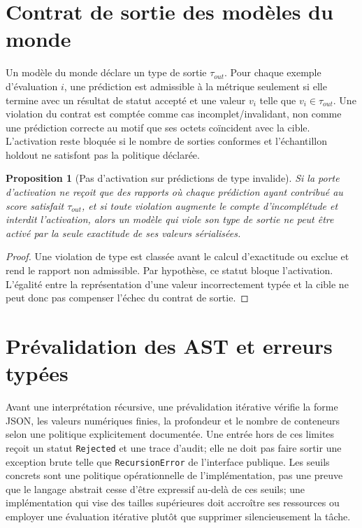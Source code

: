 \documentclass[11pt,a4paper,openany]{book}
\theoremstyle{definition}
\theoremstyle{plain}
\newtheorem{proposition}[definition]{Proposition}
\theoremstyle{remark}
\begin{document}
\section{Contrat de sortie des modèles du monde}
Un modèle du monde déclare un type de sortie $\tau_{out}$. Pour chaque exemple d'évaluation $i$, une prédiction est admissible à la métrique seulement si elle termine avec un résultat de statut accepté et une valeur $v_i$ telle que $v_i\in\tau_{out}$. Une violation du contrat est comptée comme cas incomplet/invalidant, non comme une prédiction correcte au motif que ses octets coïncident avec la cible. L'activation reste bloquée si le nombre de sorties conformes et l'échantillon holdout ne satisfont pas la politique déclarée.

\begin{proposition}[Pas d'activation sur prédictions de type invalide]
Si la porte d'activation ne reçoit que des rapports où chaque prédiction ayant contribué au score satisfait $\tau_{out}$, et si toute violation augmente le compte d'incomplétude et interdit l'activation, alors un modèle qui viole son type de sortie ne peut être activé par la seule exactitude de ses valeurs sérialisées.
\end{proposition}
\begin{proof}
Une violation de type est classée avant le calcul d'exactitude ou exclue et rend le rapport non admissible. Par hypothèse, ce statut bloque l'activation. L'égalité entre la représentation d'une valeur incorrectement typée et la cible ne peut donc pas compenser l'échec du contrat de sortie.
\end{proof}

\section{Prévalidation des AST et erreurs typées}
Avant une interprétation récursive, une prévalidation itérative vérifie la forme JSON, les valeurs numériques finies, la profondeur et le nombre de conteneurs selon une politique explicitement documentée. Une entrée hors de ces limites reçoit un statut \texttt{Rejected} et une trace d'audit; elle ne doit pas faire sortir une exception brute telle que \texttt{RecursionError} de l'interface publique. Les seuils concrets sont une politique opérationnelle de l'implémentation, pas une preuve que le langage abstrait cesse d'être expressif au-delà de ces seuils; une implémentation qui vise des tailles supérieures doit accroître ses ressources ou employer une évaluation itérative plutôt que supprimer silencieusement la tâche.
\end{document}
